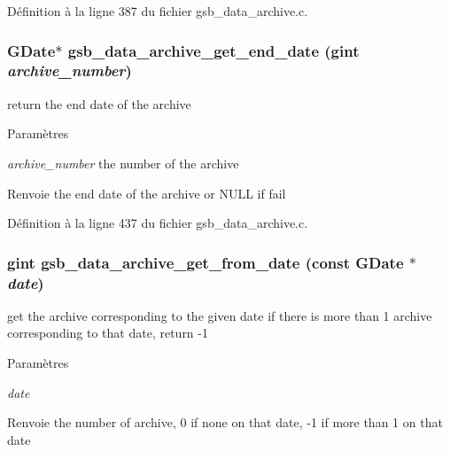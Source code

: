 Définition à la ligne 387 du fichier gsb\_\-data\_\-archive.c.

\subsubsection[{gsb\_\-data\_\-archive\_\-get\_\-end\_\-date}]{\setlength{\rightskip}{0pt plus 5cm}GDate$\ast$ gsb\_\-data\_\-archive\_\-get\_\-end\_\-date (gint {\em archive\_\-number})}\label{gsb__data__archive_8h_acd3d52c042e9c6d8d3a42cd55c69cdd2}
return the end date of the archive


\begin{DoxyParams}{Paramètres}
\item[{\em archive\_\-number}]the number of the archive\end{DoxyParams}
\begin{DoxyReturn}{Renvoie}
the end date of the archive or NULL if fail 
\end{DoxyReturn}


Définition à la ligne 437 du fichier gsb\_\-data\_\-archive.c.

\subsubsection[{gsb\_\-data\_\-archive\_\-get\_\-from\_\-date}]{\setlength{\rightskip}{0pt plus 5cm}gint gsb\_\-data\_\-archive\_\-get\_\-from\_\-date (const GDate $\ast$ {\em date})}\label{gsb__data__archive_8h_ad4fa84d9de6ee591fbe1d3e3bf42e22f}
get the archive corresponding to the given date if there is more than 1 archive corresponding to that date, return -\/1


\begin{DoxyParams}{Paramètres}
\item[{\em date}]\end{DoxyParams}
\begin{DoxyReturn}{Renvoie}
the number of archive, 0 if none on that date, -\/1 if more than 1 on that date 
\end{DoxyReturn}


